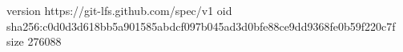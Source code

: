 version https://git-lfs.github.com/spec/v1
oid sha256:c0d0d3d618bb5a901585abdcf097b045ad3d0bfe88ce9dd9368fe0b59f220c7f
size 276088
